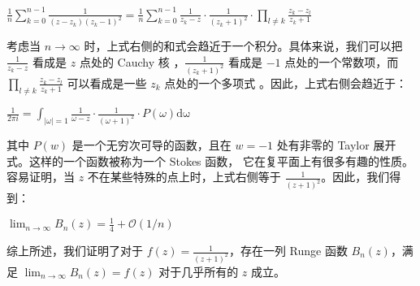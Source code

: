 \documentclass[12pt, a4paper, oneside]{article}
\begin{document}
\begin{spacing}{2.0}
\begin{center}
    $\frac{1}{n}\sum_{k = 0}^{n-1}\frac{1}{(z-z_k)(z_k - 1)^2} = \frac{1}{n}\sum_{k = 0}^{n-1}\frac{1}{z_k-z}\cdot \frac{1}{(z_k+1)^2} \cdot{\textstyle \prod_{l\neq k}}\frac{z_k - z_l}{z_k + 1}$
\end{center}

考虑当 $n \to \infty$ 时，上式右侧的和式会趋近于一个积分。具体来说，我们可以把 $\frac{1}{z_k-z}$ 看成是 $z$ 点处的 Cauchy 核
，$\frac{1}{(z_k+1)^2}$ 看成是 $-1$ 点处的一个常数项，而 $\prod_{l \neq k} \frac{z_k-z_l}{z_k+1}$ 可以看成是一些 $z_k$ 点处的一个多项式
。因此，上式右侧会趋近于：


\begin{center}
    $\frac{1}{2\pi i} = \int_{|\omega| = 1}\frac{1}{\omega - z}\cdot \frac{1}{(\omega+1)^2}\cdot P(\omega)\mathrm{d\omega}$
\end{center}

其中 $P(w)$ 是一个无穷次可导的函数，且在 $w=-1$ 处有非零的 Taylor 展开式。这样的一个函数被称为一个 Stokes 函数，
它在复平面上有很多有趣的性质。容易证明，当 $z$ 不在某些特殊的点上时，上式右侧等于 $\frac{1}{(z+1)^2}$。因此，我们得到：

\begin{center}
    $\lim_{n\to \infty}B_n(z) = \frac{1}{4} + \mathcal{O}(1/n)$
\end{center}

综上所述，我们证明了对于 $f(z) = \frac{1}{(z+1)^2}$，存在一列 Runge 函数 $B_n(z)$，满足 $\lim_{n \to \infty} B_n(z) = f(z)$ 
对于几乎所有的 $z$ 成立。











\end{spacing}{}



\end{document}
